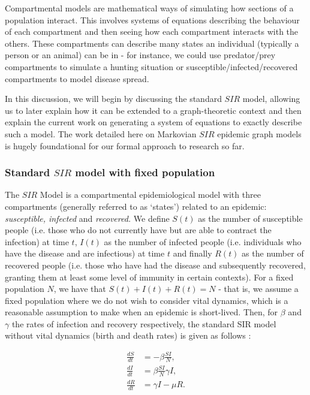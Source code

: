 \documentclass[../report.tex]{subfiles}
\begin{document}
Compartmental models are mathematical ways of simulating how sections of a population interact. This involves systems of equations describing the behaviour of each compartment and then seeing how each compartment interacts with the others. These compartments can describe many states an individual (typically a person or an animal) can be in - for instance, we could use predator/prey compartments to simulate a hunting situation or susceptible/infected/recovered compartments to model disease spread. 

In this discussion, we will begin by discussing the standard $SIR$ model, allowing us to later explain how it can be extended to a graph-theoretic context and then explain the current work on generating a system of equations to exactly describe such a model. The work detailed here on Markovian $SIR$ epidemic graph models is hugely foundational for our formal approach to research so far.

\subsubsection{Standard $SIR$ model with fixed population}

The $SIR$ Model is a compartmental epidemiological model with three compartments (generally referred to as `states') related to an epidemic: {\it susceptible, infected} and {\it recovered.} We define $S(t)$ as the number of susceptible people (i.e. those who do not currently have but are able to contract the infection) at time $t$, $I(t)$ as the number of infected people (i.e. individuals who have the disease and are infectious) at time $t$ and finally $R(t)$ as the number of recovered people (i.e. those who have had the disease and subsequently recovered, granting them at least some level of immunity in certain contexts). For a fixed population $N$, we have that $S(t) + I(t) + R(t) = N$ - that is, we assume a fixed population where we do not wish to consider vital dynamics, which is a reasonable assumption to make when an epidemic is short-lived. Then, for $\beta$ and $\gamma$ the rates of infection and recovery respectively, the standard SIR model without vital dynamics (birth and death rates) is given as follows \cite{hethcote_00}:

\begin{align}
\frac{dS}{dt} & = -\beta \frac{SI}{N} \label{dS},\\
\frac{dI}{dt} & = \beta\frac{SI}{N} \gamma I \label{dI},\\
\frac{dR}{dt} & = \gamma I - \mu R \label{dR}.
\end{align}
\end{document}
